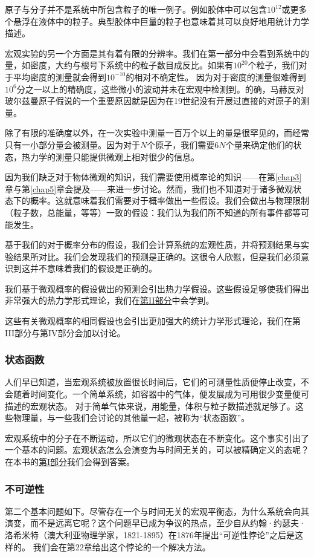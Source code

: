 \documentclass[UTF8]{ctexart}
\numberwithin{equation}{section}%
\numberwithin{figure}{section}%
\begin{document}
    原子与分子并不是系统中所包含粒子的唯一例子。例如胶体中可以包含$10^{12}$或更多个悬浮在液体中的粒子。典型胶体中巨量的粒子也意味着其可以良好地用统计力学描述。

    宏观实验的另一个方面是其有着有限的分辨率。我们在第一部分中会看到系统中的量，如密度，大约与根号下系统中的粒子数目成反比。如果有$10^{20}$个粒子，我们对于平均密度的测量就会得到$10^{-10}$的相对不确定性。
    因为对于密度的测量很难得到$10^6$分之一以上的精确度，这些微小的波动并未在宏观中检测到。的确，马赫反对玻尔兹曼原子假说的一个重要原因就是因为在19世纪没有开展过直接的对原子的测量。

    除了有限的准确度以外，在一次实验中测量一百万个以上的量是很罕见的，而经常只有一小部分量会被测量。因为对于$N$个原子，我们需要$6N$个量来确定他们的状态，热力学的测量只能提供微观上相对很少的信息。

    因为我们缺乏对于物体微观的知识，我们需要使用概率论的知识——在第\ref{chap3}章与第\ref{chap5}章会提及——来进一步讨论。然而，我们也不知道对于诸多微观状态下的概率。这就意味着我们需要对于概率做出一些假设。我们会做出与物理限制（粒子数，总能量，等等）一致的假设：我们认为我们所不知道的所有事件都等可能发生。

    基于我们的对于概率分布的假设，我们会计算系统的宏观性质，并将预测结果与实验结果所对比。我们会发现我们的预测是正确的。这很令人欣慰，但是我们必须意识到这并不意味着我们的假设是正确的。
    
    我们基于微观概率的假设做出的预测会引出热力学假设。这些假设足够使我们得出非常强大的热力学形式理论，我们在\hyperref[part2]{第II部分}中会学到。

    这些有关微观概率的相同假设也会引出更加强大的统计力学形式理论，我们在第III部分与第IV部分会加以讨论。

    \subsubsection{状态函数}

    人们早已知道，当宏观系统被放置很长时间后，它们的可测量性质便停止改变，不会随着时间变化。一个简单系统，如容器中的气体，便发展成为可用很少变量便可描述的宏观状态。
    对于简单气体来说，用能量，体积与粒子数描述就足够了。这些物理量，与一些我们会讨论的其他量一起，被称为“状态函数”。

    宏观系统中的分子在不断运动，所以它们的微观状态在不断变化。这个事实引出了一个基本的问题。宏观状态怎么会演变为与时间无关的，可以被精确定义的态呢？在本书的\hyperref[part1]{第I部分}我们会得到答案。
    \subsubsection{不可逆性}
    第二个基本问题如下。尽管存在一个与时间无关的宏观平衡态，为什么系统会向其演变，而不是远离它呢？这个问题早已成为争议的热点，至少自从约翰·约瑟夫·洛希米特（澳大利亚物理学家，1821-1895）在1876年提出“可逆性悖论”之后是这样的。
    我们会在第22章给出这个悖论的一个解决方法。
\end{document}
